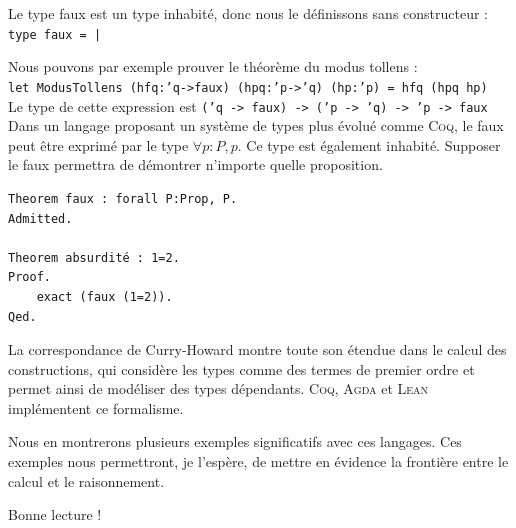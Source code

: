 \documentclass[11pt]{book}
\let\oldtexttt\texttt
\renewcommand{\texttt}[1]{{\footnotesize\oldtexttt{#1}}}
\begin{document}
Le type faux est un type inhabité, donc nous le définissons sans constructeur : \texttt{type faux = | }

Nous pouvons par exemple prouver le théorème du modus tollens : \\

\texttt{let ModusTollens (hfq:'q->faux) (hpq:'p->'q) (hp:'p) = hfq (hpq hp)}  \\
Le type de cette expression est  \texttt{('q -> faux) -> ('p -> 'q) -> 'p -> faux}  \\

Dans un langage proposant un système de types plus évolué comme \textsc{Coq}, le faux peut être exprimé 
par le type $\forall p:P, p$. Ce type est également inhabité. Supposer le faux permettra de démontrer 
n'importe quelle proposition.

\begin{Verbatim}
Theorem faux : forall P:Prop, P.
Admitted.

Theorem absurdité : 1=2.
Proof.
    exact (faux (1=2)). 
Qed.
\end{Verbatim}

La correspondance de Curry-Howard montre toute son étendue dans le calcul des constructions, qui 
considère les types comme des termes de premier ordre et permet ainsi de modéliser des types dépendants.
\textsc{Coq}, \textsc{Agda} et \textsc{Lean} implémentent ce formalisme.

Nous en montrerons plusieurs exemples significatifs avec ces langages.
Ces exemples nous permettront, je l'espère, de mettre en évidence la frontière entre le calcul et
le raisonnement.

\vspace{0.3cm}
Bonne lecture !

















\printbibliography
\end{document}
